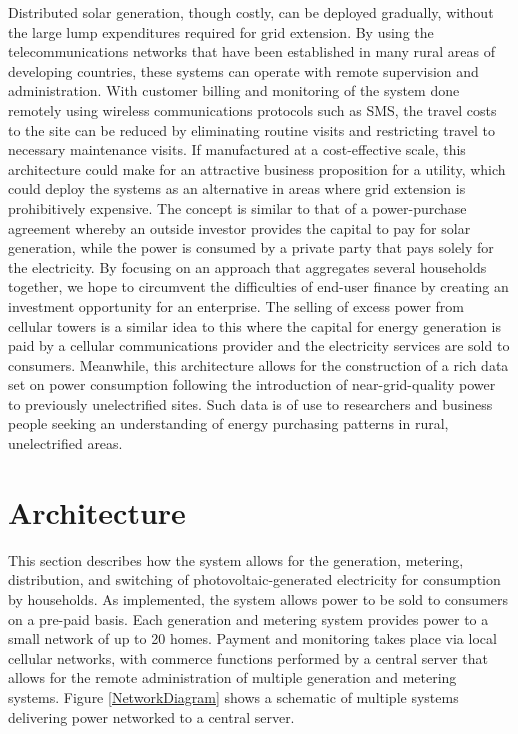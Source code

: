 \documentclass{sig-alternate}
\begin{document}
Distributed solar generation, though costly, can be deployed gradually,
without the large lump expenditures required for grid extension.
By using the telecommunications networks that have been established in
many rural areas of developing countries, these systems can operate with
remote supervision and administration.
With customer billing and monitoring of the system done remotely
using wireless communications protocols such as SMS, the travel costs
to the site can be reduced by eliminating routine visits and restricting 
travel to necessary maintenance visits.
If manufactured at a cost-effective scale, this architecture could make
for an attractive business proposition for a utility, which could deploy
the systems as an alternative in areas where grid extension is
prohibitively expensive.
The concept is similar to that of a power-purchase agreement whereby an
outside investor provides the capital to pay for solar generation, while
the power is consumed by a private party that pays solely for the
electricity.
By focusing on an approach that aggregates several households together,
we hope to circumvent the difficulties of end-user finance by creating
an investment opportunity for an enterprise.
The selling of excess power from cellular towers is a similar idea to
this where the capital for energy generation is paid by a cellular 
communications provider and the electricity services are sold to consumers.
Meanwhile, this architecture allows for the construction of a rich data
set on power consumption following the introduction of near-grid-quality
power to previously unelectrified sites.
Such data is of use to researchers and business people seeking an
understanding of energy purchasing patterns in rural, unelectrified
areas.


\section{Architecture}

This section describes how the system allows for the generation,
metering, distribution, and switching of photovoltaic-generated
electricity for consumption by households.
As implemented, the system allows power to be sold to consumers on a
pre-paid basis.
Each generation and metering system provides power to a small network of
up to 20 homes.
Payment and monitoring takes place via local cellular networks, with
commerce functions performed by a central server that allows for the
remote administration of multiple generation and metering systems.
Figure \ref{NetworkDiagram} shows a schematic of multiple systems delivering
power networked to a central server.
\end{document}
